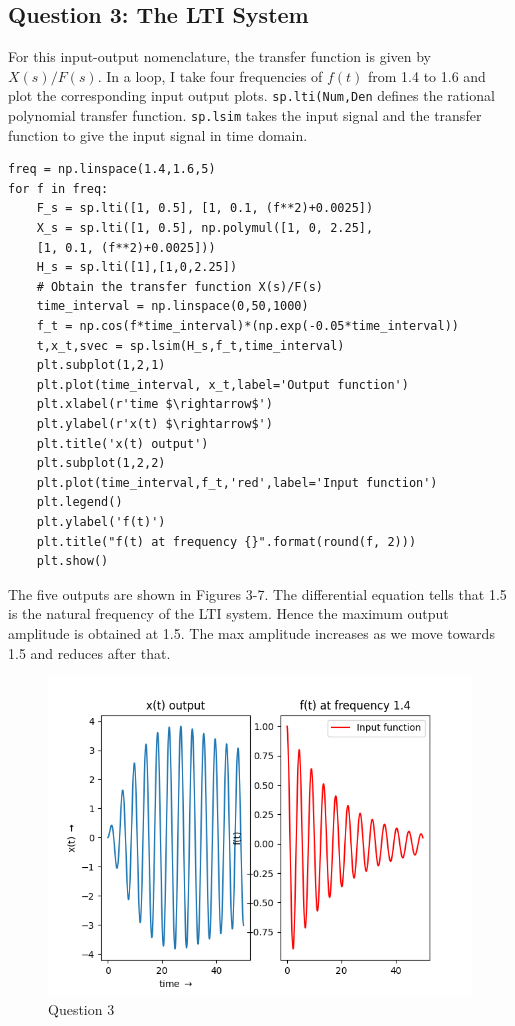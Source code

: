 \documentclass[11pt, a4paper]{article}
\begin{document}
\subsection{Question 3: The LTI System}
For this input-output nomenclature, the transfer function is given by $X(s)/F(s)$. In a loop, I take four frequencies of $f(t)$ from 1.4 to 1.6 and plot the corresponding input output plots. \texttt{sp.lti(Num,Den} defines the rational polynomial transfer function. \texttt{sp.lsim} takes the input signal and the transfer function to give the input signal in time domain.
 
\begin{verbatim}
freq = np.linspace(1.4,1.6,5)
for f in freq:
    F_s = sp.lti([1, 0.5], [1, 0.1, (f**2)+0.0025])
    X_s = sp.lti([1, 0.5], np.polymul([1, 0, 2.25], 
    [1, 0.1, (f**2)+0.0025]))
    H_s = sp.lti([1],[1,0,2.25])  
    # Obtain the transfer function X(s)/F(s)
    time_interval = np.linspace(0,50,1000)
    f_t = np.cos(f*time_interval)*(np.exp(-0.05*time_interval))
    t,x_t,svec = sp.lsim(H_s,f_t,time_interval)
    plt.subplot(1,2,1)
    plt.plot(time_interval, x_t,label='Output function')
    plt.xlabel(r'time $\rightarrow$')
    plt.ylabel(r'x(t) $\rightarrow$')
    plt.title('x(t) output')
    plt.subplot(1,2,2)
    plt.plot(time_interval,f_t,'red',label='Input function')
    plt.legend()
    plt.ylabel('f(t)')
    plt.title("f(t) at frequency {}".format(round(f, 2)))
    plt.show()

\end{verbatim}

The five outputs are shown in Figures 3-7. The differential equation tells that 1.5 is the natural frequency of the LTI system. Hence the maximum output amplitude is obtained at 1.5. The max amplitude increases as we move towards 1.5 and reduces after that. 

\begin{figure}[!tbh]
   	\centering
  \includegraphics[scale=0.5]{Q3-1.png} 
    \caption{Question 3} 	
    \label{time response q3.1}
   \end{figure} 
   
\end{document}
